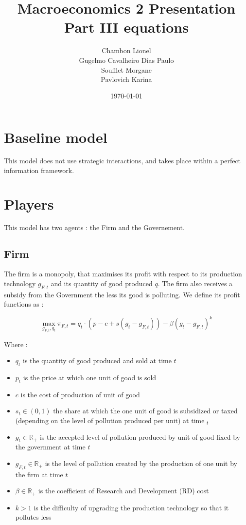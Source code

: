 \documentclass{article}
\title{Macroeconomics 2 Presentation \\ Part III equations}
\author{Chambon Lionel \\ Gugelmo Cavalheiro Dias Paulo \\ Soufflet Morgane \\ Pavlovich Karina}
\date{\today}
\begin{document}
\maketitle

\section{Baseline model}

This model does not use strategic interactions, and takes place within a perfect information framework. 

\section{Players}

This model has two agents : the Firm and the Governement. 

\subsection{Firm}

The firm is a monopoly, that maximises its profit with respect to its production technology $g_{F,t}$ and its quantity of good produced $q$. The firm also receives a subsidy from the Government the less its good is polluting. We define its profit functions as : 

\begin{equation}
    \max_{g_{F,t},q_{t}}{\pi_{F,t}=q_{t}\cdot\left(p-c+s(g_{t}-g_{F,t})\right)-\beta(g_{t}-g_{F,t})^{k}}
\end{equation}

Where : 
\begin{itemize}
    \item $q_{t}$ is the quantity of good produced and sold at time $t$
    \item $p_{t}$ is the price at which one unit of good is sold
    \item $c$ is the cost of production of unit of good
    \item $s_{t}\in\left(0,1\right)$ the share at which the one unit of good is subsidized or taxed (depending on the level of pollution produced per unit) at time $_{t}$
    \item $g_{t}\in\mathbb{R}_{+}$ is the accepted level of pollution produced by unit of good fixed by the government at time $t$
    \item $g_{F,t}\in\mathbb{R}_{+}$ is the level of pollution created by the production of one unit by the firm at time $t$
    \item $\beta\in\mathbb{R}_{+}$ is the coefficient of Research and Development (RD) cost
    \item $k>1$ is the difficulty of upgrading the production technology so that it pollutes less
\end{itemize}
\end{document}
